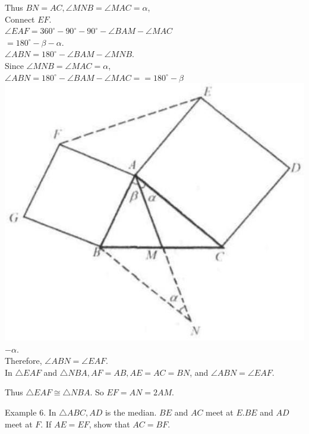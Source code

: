 \documentclass[10pt]{article}
\begin{document}
Thus \(B N=A C, \angle M N B=\angle M A C=\alpha\),\\
Connect \(E F\).\\
\(\angle E A F=360^{\circ}-90^{\circ}-90^{\circ}-\angle B A M-\angle M A C\)\\
\(=180^{\circ}-\beta-\alpha\).\\
\(\angle A B N=180^{\circ}-\angle B A M-\angle M N B\).\\
Since \(\angle M N B=\angle M A C=\alpha\),\\
\(\angle A B N=180^{\circ}-\angle B A M-\angle M A C==180^{\circ}-\beta\)\\
\includegraphics[max width=\textwidth, center]{2025_04_17_97bc1f7e44d93c271a88g-025}\\
\(-\alpha\).\\
Therefore, \(\angle A B N=\angle E A F\).\\
In \(\triangle E A F\) and \(\triangle N B A, A F=A B, A E=A C=B N\), and \(\angle A B N=\angle E A F\).

Thus \(\triangle E A F \cong \triangle N B A\). So \(E F=A N=2 A M\).


Example 6. In \(\triangle A B C, A D\) is the median. \(B E\) and \(A C\) meet at \(E . B E\) and \(A D\) meet at \(F\). If \(A E=E F\), show that \(A C=B F\).
\end{document}
